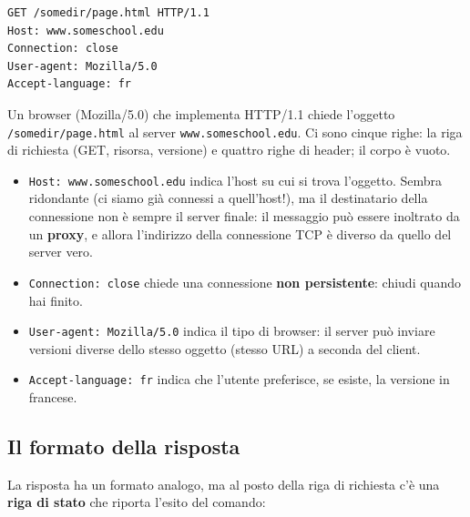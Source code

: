 \begin{lstlisting}[language=http, title={Richiesta HTTP}]
GET /somedir/page.html HTTP/1.1
Host: www.someschool.edu
Connection: close
User-agent: Mozilla/5.0
Accept-language: fr
\end{lstlisting}

Un browser (Mozilla/5.0) che implementa HTTP/1.1 chiede l'oggetto \texttt{/somedir/page.html} al server
\texttt{www.someschool.edu}. Ci sono cinque righe: la riga di richiesta (GET, risorsa, versione) e quattro
righe di header; il corpo è vuoto.

\begin{itemize}
    \item \texttt{Host: www.someschool.edu} indica l'host su cui si trova l'oggetto. Sembra ridondante (ci siamo
          già connessi a quell'host!), ma il destinatario della connessione non è sempre il server finale: il
          messaggio può essere inoltrato da un \textbf{proxy}, e allora l'indirizzo della connessione TCP è
          diverso da quello del server vero.
    \item \texttt{Connection: close} chiede una connessione \textbf{non persistente}: chiudi quando hai finito.
    \item \texttt{User-agent: Mozilla/5.0} indica il tipo di browser: il server può inviare versioni diverse
          dello stesso oggetto (stesso URL) a seconda del client.
    \item \texttt{Accept-language: fr} indica che l'utente preferisce, se esiste, la versione in francese.
\end{itemize}

\subsection{Il formato della risposta}

La risposta ha un formato analogo, ma al posto della riga di richiesta c'è una \textbf{riga di stato}
che riporta l'esito del comando:

